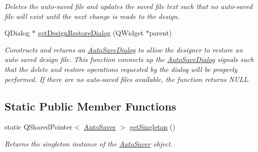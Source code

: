 \begin{DoxyCompactItemize}
\begin{DoxyCompactList}\small\item\em Deletes the auto-\/saved file and updates the saved file text such that no auto-\/saved file will exist until the next change is made to the design. \end{DoxyCompactList}\item 
\hypertarget{class_picto_1_1_auto_saver_aa003b23d0e5c82736a0609505dfdb80b}{Q\-Dialog $\ast$ \hyperlink{class_picto_1_1_auto_saver_aa003b23d0e5c82736a0609505dfdb80b}{get\-Design\-Restore\-Dialog} (Q\-Widget $\ast$parent)}\label{class_picto_1_1_auto_saver_aa003b23d0e5c82736a0609505dfdb80b}

\begin{DoxyCompactList}\small\item\em Constructs and returns an \hyperlink{class_picto_1_1_auto_save_dialog}{Auto\-Save\-Dialog} to allow the designer to restore an auto saved design file. This function connects up the \hyperlink{class_picto_1_1_auto_save_dialog}{Auto\-Save\-Dialog} signals such that the delete and restore operations requested by the dialog will be properly performed. If there are no auto-\/saved files available, the function returns N\-U\-L\-L. \end{DoxyCompactList}\end{DoxyCompactItemize}
\subsection*{Static Public Member Functions}
\begin{DoxyCompactItemize}
\item 
\hypertarget{class_picto_1_1_auto_saver_a3eb3e497f67f3e3b76e2efb6ef8022d2}{static Q\-Shared\-Pointer$<$ \hyperlink{class_picto_1_1_auto_saver}{Auto\-Saver} $>$ \hyperlink{class_picto_1_1_auto_saver_a3eb3e497f67f3e3b76e2efb6ef8022d2}{get\-Singleton} ()}\label{class_picto_1_1_auto_saver_a3eb3e497f67f3e3b76e2efb6ef8022d2}

\begin{DoxyCompactList}\small\item\em Returns the singleton instance of the \hyperlink{class_picto_1_1_auto_saver}{Auto\-Saver} object. \end{DoxyCompactList}\end{DoxyCompactItemize}
